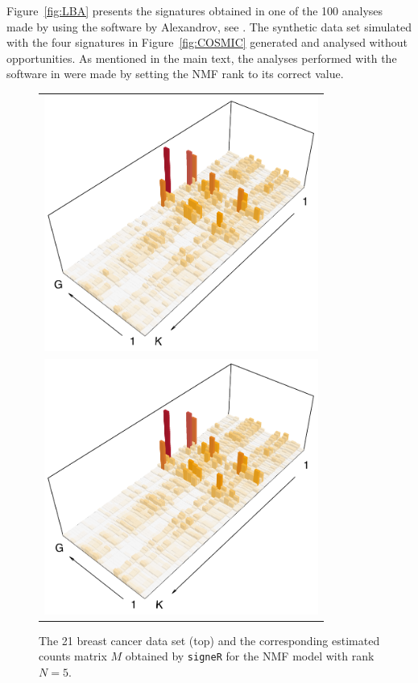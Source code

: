\documentclass[11pt]{amsart}
\theoremstyle{definition}
\begin{document}
Figure~\ref{fig:LBA} presents the signatures obtained in one of the 
100 analyses made by using the software by Alexandrov, see
\cite{A}. The synthetic data set simulated with the four signatures
in Figure~\ref{fig:COSMIC} generated and analysed without
opportunities. As mentioned in the main text, the analyses performed
with the software in \cite{A} were made by setting the NMF rank to its
correct value.





\begin{center}
\begin{figure}
 \begin{tabular}{c}
 \includegraphics[width=9cm]{sfigs/21_Breast_Cancer_3D_M} 
 \\
 \includegraphics[width=9cm]{sfigs/21_Breast_Cancer_3D_Mhat} 
 \end{tabular}
 \caption{The 21 breast cancer data set (top) and the corresponding 
   estimated counts matrix $M$ obtained by \texttt{signeR} for the NMF
   model with rank $N=5$.
 }\label{fig:bcancerDATA}
\end{figure}
\end{center}
\end{document}
